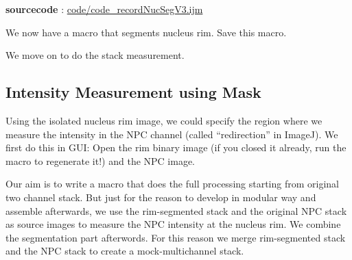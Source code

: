 \textbf{sourcecode} : \href{https://github.com/miura/BIAS_Nucleus_Segmentation/blob/struct_authorea/code_recordNucSegV3.ijm}{code/code\_recordNucSegV3.ijm}

We now have a macro that segments nucleus rim. Save this macro.

We move on to do the stack measurement.

\subsection{Intensity Measurement using Mask}

Using the isolated nucleus rim image, we could specify the region where we measure the intensity in the NPC channel (called ``redirection'' in ImageJ). We first do this in GUI: Open the rim binary image (if you closed it already, run the macro to regenerate it!) and the NPC image.

Our aim is to write a macro that does the full processing starting from original two channel stack. But just for the reason to develop in modular way and assemble afterwards, we use the rim-segmented stack and the original NPC stack as source images to measure the NPC intensity at the nucleus rim. We combine the segmentation part afterwords. For this reason we merge rim-segmented stack and the NPC stack to create a mock-multichannel stack.